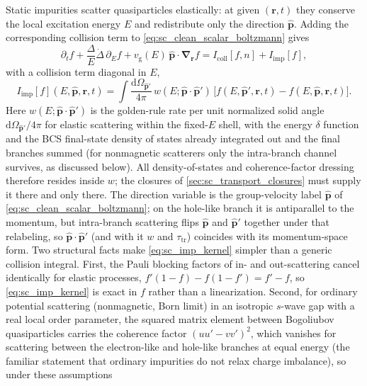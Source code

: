 \documentclass[
  aps,
  prb,
  preprint,
  superscriptaddress,
  longbibliography,
  nofootinbib
]{revtex4-2}
\newcommand{\dd}{\mathrm{d}}
\newcommand{\br}{\mathbf{r}}
\newcommand{\bp}{\mathbf{p}}
\newcommand{\bnabla}{\boldsymbol{\nabla}}
\newcommand{\vg}{v_{\mathrm{g}}}
\newcommand{\tautr}{\tau_{\mathrm{tr}}}
\newcommand{\Icoll}{I_{\mathrm{coll}}}
\begin{document}
Static impurities scatter quasiparticles elastically: at given \((\br,t)\)
they conserve the local excitation energy \(E\) and redistribute only the
direction \(\hat{\bp}\). Adding the corresponding collision term to
\cref{eq:sc_clean_scalar_boltzmann} gives
\begin{equation}
  \partial_t f
  +
  \frac{\Delta}{E}\dot{\Delta}\,\partial_E f
  +
  \vg(E)\,\hat{\bp}\cdot\bnabla_{\br} f
  =
  \Icoll[f,n]
  +
  I_{\mathrm{imp}}[f],
  \label{eq:sc_boltzmann_imp}
\end{equation}
with a collision term diagonal in \(E\),
\begin{equation}
  I_{\mathrm{imp}}[f](E,\hat{\bp},\br,t)
  =
  \int\frac{\dd\Omega_{\hat{\bp}'}}{4\pi}\,
  w(E;\hat{\bp}\cdot\hat{\bp}')\,
  \bigl[
    f(E,\hat{\bp}',\br,t)
    -
    f(E,\hat{\bp},\br,t)
  \bigr].
  \label{eq:sc_imp_kernel}
\end{equation}
Here \(w(E;\hat{\bp}\cdot\hat{\bp}')\) is the golden-rule rate per
unit normalized solid angle \(\dd\Omega_{\hat{\bp}'}/4\pi\) for elastic
scattering within the
fixed-\(E\) shell, with the energy \(\delta\) function and the BCS
final-state density of states already integrated out and the final
branches summed (for nonmagnetic scatterers only the intra-branch
channel survives, as discussed below). All density-of-states and
coherence-factor dressing therefore resides inside \(w\); the closures
of \cref{sec:sc_transport_closures} must supply it there and only
there. The direction variable is the group-velocity label
\(\hat{\bp}\) of \cref{eq:sc_clean_scalar_boltzmann}; on the
hole-like branch it is antiparallel to the momentum, but intra-branch
scattering flips \(\hat{\bp}\) and \(\hat{\bp}'\) together under that
relabeling, so \(\hat{\bp}\cdot\hat{\bp}'\) (and with it \(w\) and
\(\tautr\)) coincides with its momentum-space form. Two structural facts make \cref{eq:sc_imp_kernel} simpler than
a generic collision integral. First, the Pauli blocking factors of in- and
out-scattering cancel identically for elastic processes,
\(f'(1-f)-f(1-f')=f'-f\), so \cref{eq:sc_imp_kernel} is exact in \(f\)
rather than a linearization. Second, for ordinary potential scattering
(nonmagnetic, Born limit) in an isotropic \(s\)-wave gap with a real
local order parameter, the squared
matrix element between Bogoliubov quasiparticles carries the coherence
factor \((uu'-vv')^{2}\), which vanishes for scattering between the
electron-like and hole-like branches at equal energy
\cite{bardeen1959,tinkham2004} (the familiar statement that ordinary
impurities do not relax charge imbalance), so under these assumptions
\end{document}
